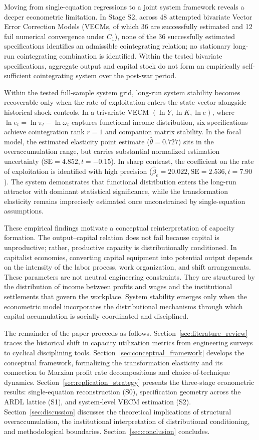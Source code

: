 Moving from single-equation regressions to a joint system framework reveals a deeper econometric limitation. In Stage S2, across 48 attempted bivariate Vector Error Correction Models (VECMs, of which 36 are successfully estimated and 12 fail numerical convergence under $C_1$), none of the 36 successfully estimated specifications identifies an admissible cointegrating relation; no stationary long-run cointegrating combination is identified. Within the tested bivariate specifications, aggregate output and capital stock do not form an empirically self-sufficient cointegrating system over the post-war period.

Within the tested full-sample system grid, long-run system stability becomes recoverable only when the rate of exploitation enters the state vector alongside historical shock controls. In a trivariate VECM $(\ln Y, \ln K, \ln e)$, where $\ln e_t = \ln \pi_t - \ln \omega_t$ captures functional income distribution, six specifications achieve cointegration rank $r=1$ and companion matrix stability. In the focal model, the estimated elasticity point estimate ($\hat{\theta} = 0.727$) sits in the overaccumulation range, but carries substantial normalized estimation uncertainty ($\text{SE} = 4.852, t = -0.15$). In sharp contrast, the coefficient on the rate of exploitation is identified with high precision ($\hat{\beta}_e = 20.022, \text{SE} = 2.536, t = 7.90$). The system demonstrates that functional distribution enters the long-run attractor with dominant statistical significance, while the transformation elasticity remains imprecisely estimated once unconstrained by single-equation assumptions.

These empirical findings motivate a conceptual reinterpretation of capacity formation. The output--capital relation does not fail because capital is unproductive; rather, productive capacity is distributionally conditioned. In capitalist economies, converting capital equipment into potential output depends on the intensity of the labor process, work organization, and shift arrangements. These parameters are not neutral engineering constraints. They are structured by the distribution of income between profits and wages and the institutional settlements that govern the workplace. System stability emerges only when the econometric model incorporates the distributional mechanisms through which capital accumulation is socially coordinated and disciplined.

The remainder of the paper proceeds as follows. Section~\ref{sec:literature_review} traces the historical shift in capacity utilization metrics from engineering surveys to cyclical disciplining tools. Section~\ref{sec:conceptual_framework} develops the conceptual framework, formalizing the transformation elasticity and its connection to Marxian profit rate decompositions and choice-of-technique dynamics. Section~\ref{sec:replication_strategy} presents the three-stage econometric results: single-equation reconstruction (S0), specification geometry across the ARDL lattice (S1), and system-level VECM estimation (S2). Section~\ref{sec:discussion} discusses the theoretical implications of structural overaccumulation, the institutional interpretation of distributional conditioning, and methodological boundaries. Section~\ref{sec:conclusion} concludes.
